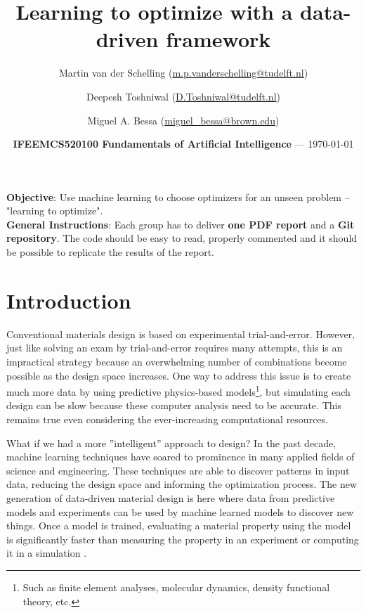 \documentclass[10pt,a4paper,twoside]{article} %
\title{Learning to optimize with a data-driven framework} %
\author[1]{Martin van der Schelling (\href{mailto:m.p.vanderschelling@tudelft.nl}{m.p.vanderschelling@tudelft.nl})}
\author[2]{Deepesh Toshniwal (\href{mailto:D.Toshniwal@tudelft.nl}{D.Toshniwal@tudelft.nl})}
\author[3]{Miguel A. Bessa (\href{mailto:miguel\_bessa@brown.edu}{miguel\_bessa@brown.edu})}
\affil[1]{Doctoral Researcher at Delft University of Technology, The Netherlands}
\affil[2]{Assistant Professor at Delft University of Technology, The Netherlands}
\affil[3]{Associate Professor at Brown University, USA}
\date{\textbf{IFEEMCS520100 Fundamentals of Artificial Intelligence} --- \today} %
\begin{document}
\maketitle %


\begin{framed}
    \textbf{Objective}: Use machine learning to choose optimizers for an unseen problem -- "learning to optimize".\\
	\textbf{General Instructions}: Each group has to deliver \textbf{one PDF report} and a \textbf{Git repository}. The code should be easy to read, properly commented and it should be possible to replicate the results of the report.
\end{framed}


\section*{Introduction}

Conventional materials design is based on experimental trial-and-error. However, just like solving an exam by trial-and-error requires many attempts, this is an impractical strategy because an overwhelming number of combinations become possible as the design space increases. One way to address this issue is to create much more data by using predictive physics-based models\footnote{Such as finite element analyses, molecular dynamics, density functional theory, etc.}, but simulating each design can be slow because these computer analysis need to be accurate. This remains true even considering the ever-increasing computational resources.

What if we had a more ''intelligent'' approach to design? In the past decade, machine learning techniques have soared to prominence in many applied fields of science and engineering. These techniques are able to discover patterns in input data, reducing the design space and informing the optimization process. The new generation of data-driven material design is here where data from predictive models and experiments can be used by machine learned models to discover new things. Once a model is trained, evaluating a material property using the model is significantly faster than measuring the property in an experiment or computing it in a simulation \cite{Kadulkar2022, Guo2021}.
\end{document}
